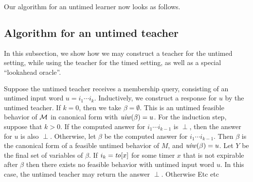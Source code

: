 Our algorithm for an untimed learner now looks as follows.

%

\subsection{Algorithm for an untimed teacher}
In this subsection, we show how we may construct a teacher for the untimed setting, while using the
teacher for the timed setting, as well as a special ``lookahead oracle''.

Suppose the untimed teacher receives a membership query, consisting of an untimed input word
$u = i_1 \cdots i_k$.
Inductively, we construct a response for $u$ by the untimed teacher.
If $k=0$, then we take $\beta = \emptyset$.
This is an untimed feasible behavior of ${\cal M}$ in canonical form with $\mathit{uiw}(\beta)=u$.
For the induction step, suppose that $k>0$.
If the computed answer for $i_1 \cdots i_{k-1}$ is $\perp$, then the answer for $u$ is also $\perp$.
Otherwise, let $\beta$ be the computed answer for $i_1 \cdots i_{k-1}$.
Then $\beta$ is the canonical form of a feasible untimed behavior of $M$, and $\mathit{uiw}(\beta)=u$.
Let $Y$ be the final set of variables of $\beta$.
If $i_k = \mathit{to}[x]$ for some timer $x$ that is not expirable after $\beta$ then there exists no feasible behavior
with untimed input word $u$. In this case, the untimed teacher may return the answer $\perp$.
Otherwise  Etc etc


